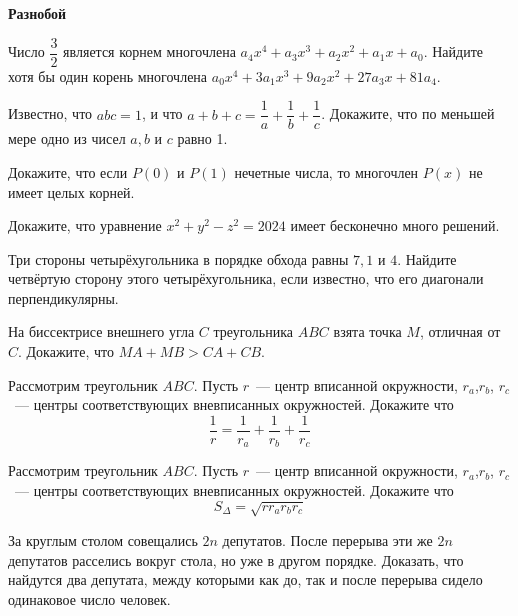 \documentclass{article}
\begin{document}
    \large

    \begin{center}
        \textbf{Разнобой}
    \end{center}


    \begin{enumerate_boxed}

        \item Число $\dfrac{3}{2}$ является корнем многочлена $a_{4}x^4 + a_{3}x^3 + a_{2}x^2 + a_{1}x + a_0$.
        Найдите хотя бы один корень многочлена $a_{0}x^4 + 3a_{1}x^3 + 9a_{2}x^2 + 27a_{3}x + 81a_4$.

        \item Известно, что $abc = 1$, и что
        $a + b + c = \dfrac{1}{a} + \dfrac{1}{b} + \dfrac{1}{c}$.
        Докажите, что по меньшей мере одно из чисел $a, b$ и $c$ равно 1.

        \item Докажите, что если $P(0)$ и $P(1)$ нечетные числа, то многочлен $P(x)$ не имеет целых корней.

        \item Докажите, что уравнение $x^2 + y^2 - z^2 = 2024$ имеет бесконечно много решений.

        \item Три стороны четырёхугольника в порядке обхода равны $7, 1$ и $4$.
        Найдите четвёртую сторону этого четырёхугольника, если известно, что его диагонали перпендикулярны.

        \item На биссектрисе внешнего угла $C$ треугольника $ABC$ взята точка $M$, отличная от $C$.
        Докажите, что $MA+ MB > CA + CB$.

        \item Рассмотрим треугольник $ABC$.
        Пусть $r$~--- центр вписанной окружности, $r_a$,$r_b$, $r_c$~--- центры соответствующих вневписанных окружностей.
        Докажите что \[\frac{1}{r} = \frac{1}{r_a} + \frac{1}{r_b} + \frac{1}{r_c} \]

        \item Рассмотрим треугольник $ABC$.
        Пусть $r$~--- центр вписанной окружности, $r_a$,$r_b$, $r_c$~--- центры соответствующих вневписанных окружностей.
        Докажите что \[S_\Delta = \sqrt{rr_{a}r_{b}r_c} \]

        \item За круглым столом совещались $2n$ депутатов.
        После перерыва эти же $2n$ депутатов расселись вокруг стола, но уже в другом порядке.
        Доказать, что найдутся два депутата, между которыми как до, так и после перерыва сидело одинаковое число человек.


\end{enumerate_boxed}
\end{document}
